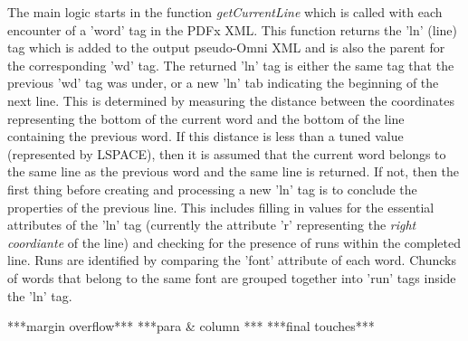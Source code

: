 The main logic starts in the function \emph{getCurrentLine} which is called with each encounter of a 'word' tag in the PDFx XML.
This function returns the 'ln' (line) tag which is added to the output pseudo-Omni XML and is also the parent for the corresponding 'wd' tag.
The returned 'ln' tag is either the same tag that the previous 'wd' tag was under, or a new 'ln' tab indicating the beginning of the next line.
This is determined by measuring the distance between the coordinates representing the bottom of the current word and the bottom of the line containing the previous word.
If this distance is less than a tuned value (represented by LSPACE), then it is assumed that the current word belongs to the same line as the previous word and the same line is returned.
If not, then the first thing before creating and processing a new 'ln' tag is to conclude the properties of the previous line.
This includes filling in values for the essential attributes of the 'ln' tag (currently the attribute 'r' representing the \emph{right coordiante} of the line) and checking for the presence of runs within the completed line.
Runs are identified by comparing the 'font' attribute of each word.
Chuncks of words that belong to the same font are grouped together into 'run' tags inside the 'ln' tag.

***margin overflow***
***para & column ***
***final touches***

